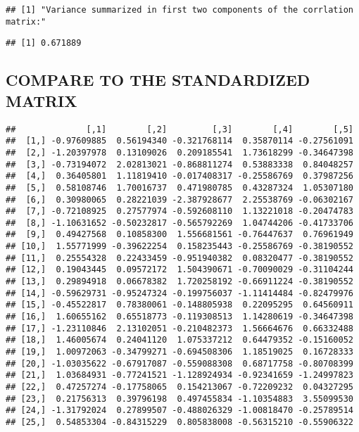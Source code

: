 \documentclass[]{article}
\begin{document}
\begin{verbatim}
## [1] "Variance summarized in first two components of the corrlation matrix:"
\end{verbatim}

\begin{verbatim}
## [1] 0.671889
\end{verbatim}

\hypertarget{compare-to-the-standardized-matrix}{%
\subsection{COMPARE TO THE STANDARDIZED
MATRIX}\label{compare-to-the-standardized-matrix}}

\begin{verbatim}
##              [,1]        [,2]         [,3]        [,4]        [,5]
##  [1,] -0.97609885  0.56194340 -0.321768114  0.35870114 -0.27561091
##  [2,] -1.20397978  0.13109026  0.209185541  1.73618299 -0.34647398
##  [3,] -0.73194072  2.02813021 -0.868811274  0.53883338  0.84048257
##  [4,]  0.36405801  1.11819410 -0.017408317 -0.25586769  0.37987256
##  [5,]  0.58108746  1.70016737  0.471980785  0.43287324  1.05307180
##  [6,]  0.30980065  0.28221039 -2.387928677  2.25538769 -0.06302167
##  [7,] -0.72108925  0.27577974 -0.592608110  1.13221018 -0.20474783
##  [8,] -1.10631652 -0.50232817 -0.565792269  1.04744206 -0.41733706
##  [9,]  0.49427568  0.10858300  1.556681561 -0.76447637  0.76961949
## [10,]  1.55771999 -0.39622254  0.158235443 -0.25586769 -0.38190552
## [11,]  0.25554328  0.22433459 -0.951940382  0.08320477 -0.38190552
## [12,]  0.19043445  0.09572172  1.504390671 -0.70090029 -0.31104244
## [13,]  0.29894918  0.06678382  1.720258192 -0.66911224 -0.38190552
## [14,] -0.59629731 -0.95247324 -0.199756037 -1.11414484 -0.82479976
## [15,] -0.45522817  0.78380061 -0.148805938  0.22095295  0.64560911
## [16,]  1.60655162  0.65518773 -0.119308513  1.14280619 -0.34647398
## [17,] -1.23110846  2.13102051 -0.210482373  1.56664676  0.66332488
## [18,]  1.46005674  0.24041120  1.075337212  0.64479352 -0.15160052
## [19,]  1.00972063 -0.34799271 -0.694508306  1.18519025  0.16728333
## [20,] -1.03035622 -0.67917087 -0.559088308  0.68717758 -0.80708399
## [21,]  1.03684931 -0.77241521 -1.128924934 -0.92341659 -1.24997823
## [22,]  0.47257274 -0.17758065  0.154213067 -0.72209232  0.04327295
## [23,]  0.21756313  0.39796198  0.497455834 -1.10354883  3.55099530
## [24,] -1.31792024  0.27899507 -0.488026329 -1.00818470 -0.25789514
## [25,]  0.54853304 -0.84315229  0.805838008 -0.56315210 -0.55906322

\end{verbatim}
\end{document}
